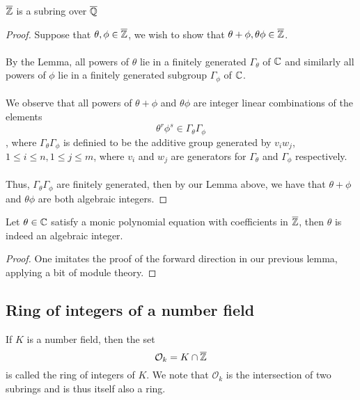 \begin{theorem}
$\overline{\mathbb{Z}}$ is a subring over $\overline{\mathbb{Q}}$
\end{theorem}

\begin{proof}
 Suppose that $\theta, \phi \in \overline{\mathbb{Z}}$, we wish to show that $\theta + \phi, \theta \phi \in \overline{\mathbb{Z}}$.\\\\
 By the Lemma, all powers of $\theta$ lie in a finitely generated $\Gamma_\theta$ of $\mathbb{C}$ and similarly all powers of $\phi$ lie in a finitely generated subgroup $\Gamma_\phi$ of $\mathbb{C}$.\\\\
 We observe that all powers of $\theta + \phi$ and $\theta \phi$ are integer linear combinations of the elements
 \[\theta^r \phi^s \in \Gamma_\theta \Gamma_\phi\]
 , where $\Gamma_\theta \Gamma_\phi$ is definied to be the additive group generated by $v_iw_j$, $1 \leq i \leq n, 1 \leq j \leq m$, where $v_i$ and $w_j$ are generators for $\Gamma_\theta$ and $\Gamma_\phi$ respectively.\\\\
 Thus, $\Gamma_\theta \Gamma_\phi$ are finitely generated, then by our Lemma above, we have that $\theta + \phi$ and $\theta \phi$ are both algebraic integers.
\end{proof}

\begin{theorem}[p. 44 or 45]
Let $\theta \in \mathbb{C}$ satisfy a monic polynomial equation with coefficients in $\overline{\mathbb{Z}}$, then $\theta$ is indeed an algebraic integer.
\end{theorem}

\begin{proof}
One imitates the proof of the forward direction in our previous lemma, applying a bit of module theory.
\end{proof}

\subsection{Ring of integers of a number field}

\begin{definition}
If $K$ is a number field, then the set
\[\mathcal{O}_k = K \cap \overline{\mathbb{Z}}\]
is called the ring of integers of $K$. We note that $\mathcal{O}_k$ is the intersection of two subrings and is thus itself also a ring.
\end{definition}

